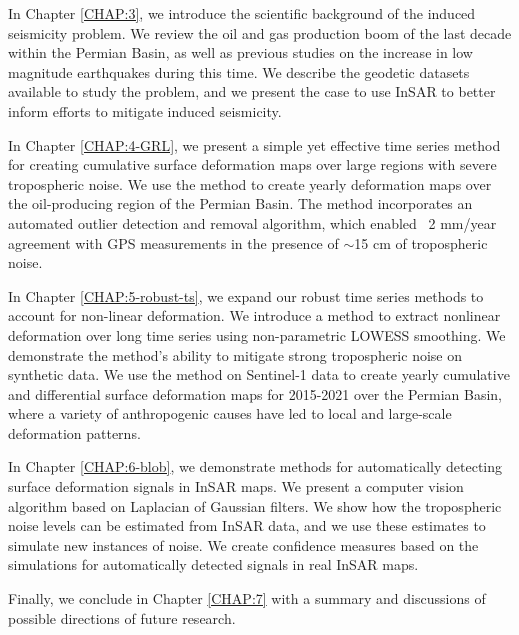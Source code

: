 In Chapter \ref{CHAP:3}, we introduce the scientific background of the induced seismicity problem. We review the oil and gas production boom of the last decade within the Permian Basin, as well as previous studies on the increase in low magnitude earthquakes during this time. We describe the geodetic datasets available to study the problem, and we present the case to use InSAR 
to better inform efforts to mitigate induced seismicity.


In Chapter \ref{CHAP:4-GRL}, we present a simple yet effective time series method for creating cumulative surface deformation maps over large regions with severe tropospheric noise. We use the method to create yearly deformation maps over the oil-producing region of the Permian Basin. The method incorporates an automated outlier detection and removal algorithm, which enabled ~2 mm/year agreement with GPS measurements in the presence of $\sim$15 cm of tropospheric noise.


In Chapter \ref{CHAP:5-robust-ts}, we expand our robust time series methods to account for non-linear deformation. We introduce a method to extract nonlinear deformation over long time series using non-parametric LOWESS smoothing. We demonstrate the method's ability to mitigate strong tropospheric noise on synthetic data. We use the method on Sentinel-1 data to create yearly cumulative and differential surface deformation maps for 2015-2021 over the Permian Basin, where a variety of anthropogenic causes have led to local and large-scale deformation patterns.


In Chapter \ref{CHAP:6-blob}, we demonstrate methods for automatically detecting surface deformation signals in InSAR maps. We present a computer vision algorithm based on Laplacian of Gaussian filters. We show how the tropospheric noise levels can be estimated from InSAR data, and we use these estimates to simulate new instances of noise. We create confidence measures based on the simulations for automatically detected signals in real InSAR maps.


Finally, we conclude in Chapter \ref{CHAP:7} with a summary and discussions of possible directions of future research.
